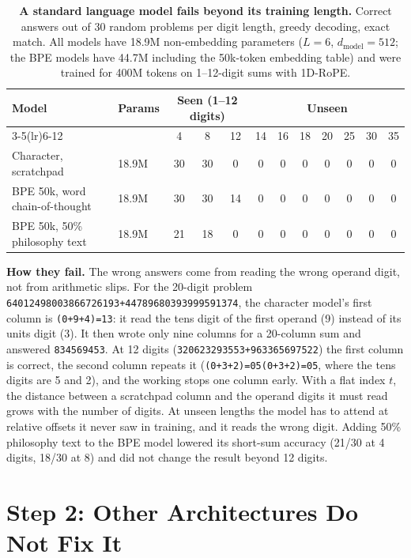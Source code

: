 \documentclass[10pt,twocolumn]{article}
\begin{document}
\begin{table}[!t]
\centering
\footnotesize
\setlength{\tabcolsep}{4pt}
\renewcommand{\arraystretch}{1.12}
\caption{\textbf{A standard language model fails beyond its training length.} Correct answers out of 30 random problems per digit length, greedy decoding, exact match. All models have 18.9M non-embedding parameters ($L=6$, $d_{\text{model}}=512$; the BPE models have 44.7M including the 50k-token embedding table) and were trained for 400M tokens on 1--12-digit sums with 1D-RoPE.}\label{tab:step1}
\begin{tabular}{@{}llcccccccccc@{}}
\toprule
Model & Params & \multicolumn{3}{c}{Seen (1--12 digits)} & \multicolumn{7}{c}{Unseen} \\
\cmidrule(lr){3-5}\cmidrule(lr){6-12}
& & 4 & 8 & 12 & 14 & 16 & 18 & 20 & 25 & 30 & 35 \\
\midrule
Character, scratchpad & 18.9M & 30 & 30 & 0 & 0 & 0 & 0 & 0 & 0 & 0 & 0 \\
BPE 50k, word chain-of-thought & 18.9M & 30 & 30 & 14 & 0 & 0 & 0 & 0 & 0 & 0 & 0 \\
BPE 50k, 50\% philosophy text & 18.9M & 21 & 18 & 0 & 0 & 0 & 0 & 0 & 0 & 0 & 0 \\
\bottomrule
\end{tabular}
\end{table}

\textbf{How they fail.} The wrong answers come from reading the wrong operand digit, not from arithmetic slips. For the 20-digit problem \texttt{64012498003866726193+44789680393999591374}, the character model's first column is \texttt{(0+9+4)=13}: it read the tens digit of the first operand (9) instead of its units digit (3). It then wrote only nine columns for a 20-column sum and answered \texttt{834569453}. At 12 digits (\texttt{320623293553+963365697522}) the first column is correct, the second column repeats it (\texttt{(0+3+2)=05(0+3+2)=05}, where the tens digits are 5 and 2), and the working stops one column early. With a flat index $t$, the distance between a scratchpad column and the operand digits it must read grows with the number of digits. At unseen lengths the model has to attend at relative offsets it never saw in training, and it reads the wrong digit. Adding 50\% philosophy text to the BPE model lowered its short-sum accuracy (21/30 at 4 digits, 18/30 at 8) and did not change the result beyond 12 digits.

\section{Step 2: Other Architectures Do Not Fix It}\label{sec:step2}
\end{document}
